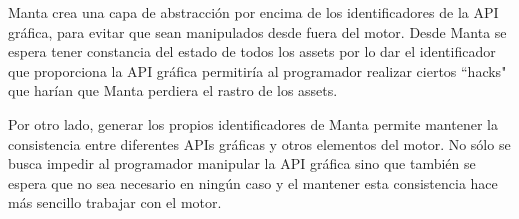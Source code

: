 Manta crea una capa de abstracción por encima de los identificadores de la API gráfica, para evitar que sean manipulados desde fuera del motor. Desde Manta se espera tener constancia del estado de todos los assets por lo dar el identificador que proporciona la API gráfica permitiría al programador realizar ciertos ``hacks" que harían que Manta perdiera el rastro de los assets.

Por otro lado, generar los propios identificadores de Manta permite mantener la consistencia entre diferentes APIs gráficas y otros elementos del motor. No sólo se busca impedir al programador manipular la API gráfica sino que también se espera que no sea necesario en ningún caso y el mantener esta consistencia hace más sencillo trabajar con el motor.
